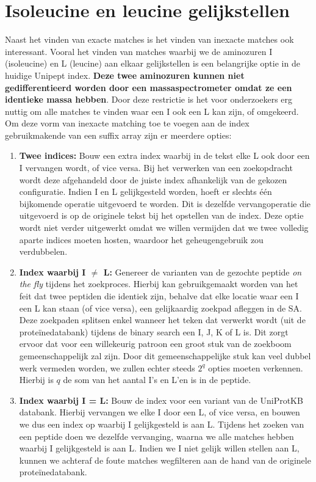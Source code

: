 \section{Isoleucine en leucine gelijkstellen}\label{sec:isoleucine-en-leucine-equivalentie}
Naast het vinden van exacte matches is het vinden van inexacte matches ook interessant.
Vooral het vinden van matches waarbij we de aminozuren I (isoleucine) en L (leucine) aan elkaar gelijkstellen is een belangrijke optie in de huidige Unipept index.
\textbf{Deze twee aminozuren kunnen niet gedifferentieerd worden door een massaspectrometer omdat ze een identieke massa hebben}.
Door deze restrictie is het voor onderzoekers erg nuttig om alle matches te vinden waar een I ook een L kan zijn, of omgekeerd.
Om deze vorm van inexacte matching toe te voegen aan de index gebruikmakende van een suffix array zijn er meerdere opties:
\begin{enumerate}
    \item \textbf{Twee indices:} Bouw een extra index waarbij in de tekst elke L ook door een I vervangen wordt, of vice versa.
    Bij het verwerken van een zoekopdracht wordt deze afgehandeld door de juiste index afhankelijk van de gekozen configuratie.
    Indien I en L gelijkgesteld worden, hoeft er slechts één bijkomende operatie uitgevoerd te worden.
    Dit is dezelfde vervangoperatie die uitgevoerd is op de originele tekst bij het opstellen van de index.
    Deze optie wordt niet verder uitgewerkt omdat we willen vermijden dat we twee volledig aparte indices moeten hosten, waardoor het geheugengebruik zou verdubbelen.
    \item \textbf{Index waarbij I $\neq$ L:} Genereer de varianten van de gezochte peptide \textit{on the fly} tijdens het zoekproces.
    Hierbij kan gebruikgemaakt worden van het feit dat twee peptiden die identiek zijn, behalve dat elke locatie waar een I een L kan staan (of vice versa), een gelijkaardig zoekpad afleggen in de SA\@.
    Deze zoekpaden splitsen enkel wanneer het teken dat verwerkt wordt (uit de proteïnedatabank) tijdens de binary search een I, J, K of L is.
    Dit zorgt ervoor dat voor een willekeurig patroon een groot stuk van de zoekboom gemeenschappelijk zal zijn.
    Door dit gemeenschappelijke stuk kan veel dubbel werk vermeden worden, we zullen echter steeds $2^{q}$ opties moeten verkennen.
    Hierbij is $q$ de som van het aantal I's en L'en is in de peptide.
    \item \textbf{Index waarbij I = L:} Bouw de index voor een variant van de UniProtKB databank.
    Hierbij vervangen we elke I door een L, of vice versa, en bouwen we dus een index op waarbij I gelijkgesteld is aan L\@.
    Tijdens het zoeken van een peptide doen we dezelfde vervanging, waarna we alle matches hebben waarbij I gelijkgesteld is aan L\@.
    Indien we I niet gelijk willen stellen aan L, kunnen we achteraf de foute matches wegfilteren aan de hand van de originele proteïnedatabank.
\end{enumerate}

